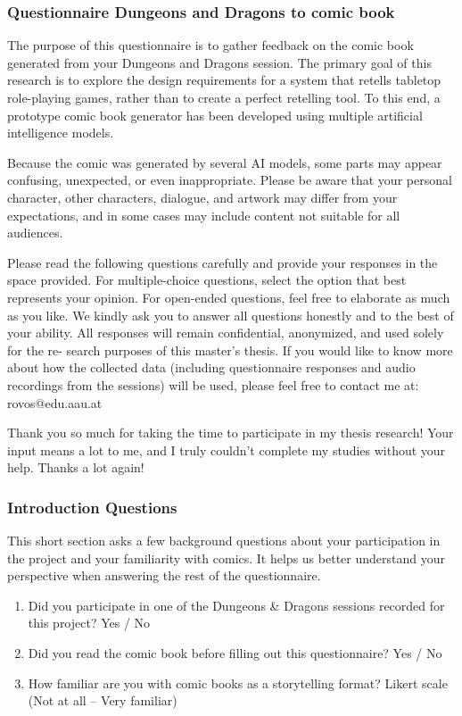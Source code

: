 \subsubsection*{Questionnaire Dungeons and Dragons to comic book}
The purpose of this questionnaire is to gather feedback on the comic book generated from your Dungeons and Dragons session. The primary goal of this research is to explore the design requirements for a system that retells tabletop role-playing games, rather than to create a perfect retelling tool. To this end, a prototype comic book generator has been developed using multiple artificial intelligence models.

Because the comic was generated by several AI models, some parts may appear confusing, unexpected, or even inappropriate. Please be aware that your personal character, other characters, dialogue, and artwork may differ from your expectations, and in some cases may include content not suitable for all audiences.

Please read the following questions carefully and provide your responses in the space provided. For multiple-choice questions, select the option that best represents your opinion. For open-ended questions, feel free to elaborate as much as you like. We kindly ask you to answer all questions honestly and to the best of your ability. All responses will remain confidential, anonymized, and used solely for the re- search purposes of this master’s thesis. If you would like to know more about how the collected data (including questionnaire responses and audio recordings from the sessions) will be used, please feel free to contact me at: rovos@edu.aau.at

Thank you so much for taking the time to participate in my thesis research! Your input means a lot to me, and I truly couldn’t complete my studies without your help. Thanks a lot again!

\subsubsection*{Introduction Questions}
This short section asks a few background questions about your participation in the project and your familiarity with comics. It helps us better understand your perspective when answering the rest of the questionnaire.
\begin{enumerate}
    \item Did you participate in one of the Dungeons \& Dragons sessions recorded for this project? \hfill Yes / No
    \item Did you read the comic book before filling out this questionnaire? \hfill Yes / No
    \item How familiar are you with comic books as a storytelling format? \hfill Likert scale (Not at all -- Very familiar)
\end{enumerate}

